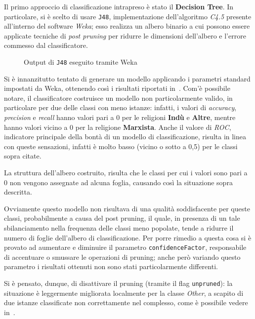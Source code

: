 \documentclass[a4paper,11pt,twoside,notitlepage,final]{scrartcl}
\begin{document}
Il primo approccio di classificazione intrapreso è stato il \textbf{Decision Tree}.
In particolare, si è scelto di usare \texttt{J48}, implementazione dell'algoritmo \emph{C4.5} presente all'interno del software \emph{Weka};
esso realizza un albero binario a cui possono essere applicate tecniche di \emph{post pruning}
per ridurre le dimensioni dell'albero e l'errore commesso dal classificatore.

\begin{figure}[H]
  \centering
  \caption{Output di \texttt{J48} eseguito tramite Weka}%
  \label{fig:j48}
\end{figure}

Si è innanzitutto tentato di generare un modello applicando i parametri standard impostati da Weka, ottenendo così i risultati riportati in~.
Com'è possibile notare, il classificatore costruisce un modello non particolarmente valido, in particolare per due delle classi con meno istanze:
infatti, i valori di \emph{accuracy}, \emph{precision} e \emph{recall} hanno valori pari a \(0\) per le religioni \textbf{Indù} e \textbf{Altre}, mentre hanno valori vicino a \(0\) per la religione \textbf{Marxista}.
Anche il valore di \emph{ROC}, indicatore principale della bontà di un modello di classificazione, risulta in linea con queste sensazioni, infatti è molto basso (vicino o sotto a 0,5) per le classi sopra citate.

La struttura dell'albero costruito, risulta che le classi per cui i valori sono pari a \(0\) non vengono assegnate ad alcuna foglia, causando
così la situazione sopra descritta.

Ovviamente questo modello non risultava di una qualità soddisfacente per queste classi, probabilmente a causa del post pruning,
il quale, in presenza di un tale sbilanciamento nella frequenza delle classi meno popolate, tende a ridurre il numero di foglie dell'albero di classificazione.
Per porre rimedio a questa cosa si è provato ad aumentare e diminuire il parametro \texttt{confidenceFactor}, responsabile di accentuare o smussare le operazioni di pruning;
anche però variando questo parametro i risultati ottenuti non sono stati particolarmente differenti.

Si è pensato, dunque, di disattivare il pruning (tramite il flag \texttt{unpruned}): la situazione è leggermente migliorata localmente per la classe \emph{Other},
a scapito di due istanze classificate non correttamente nel complesso, come è possibile vedere in~.
\end{document}
